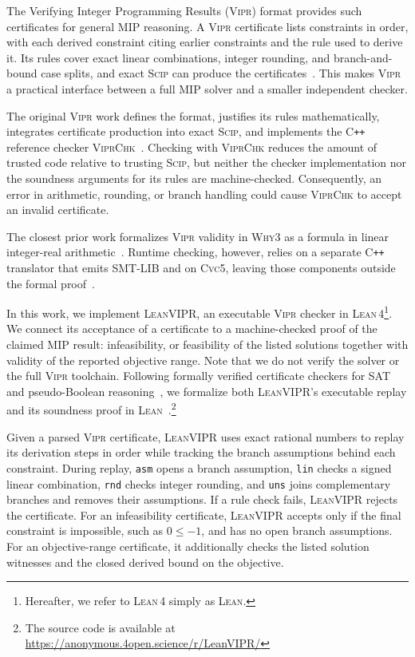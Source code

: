 \documentclass{article}
\newcommand{\code}[1]{\textcolor{blue!70!black}{\texttt{#1}}}
\newcommand{\tool}{\textsc{LeanVIPR}}
\newcommand{\scip}{\textsc{Scip}}
\newcommand{\vipr}{\textsc{Vipr}}
\newcommand{\lean}{\textsc{Lean}}
\begin{document}
The Verifying Integer Programming Results (\vipr{}) format provides such certificates for general MIP reasoning.
A \vipr{} certificate lists constraints in order, with each derived constraint citing earlier constraints and the rule used to derive it.
Its rules cover exact linear combinations, integer rounding, and branch-and-bound case splits, and exact \scip{} can produce the certificates~\citep{cheung2017verifying,eifler2023computational}.
This makes \vipr{} a practical interface between a full MIP solver and a smaller independent checker.

The original \vipr{} work defines the format, justifies its rules mathematically, integrates certificate production into exact \scip{}, and implements the C\texttt{++} reference checker \textsc{ViprChk}~\citep{cheung2017verifying}.
Checking with \textsc{ViprChk} reduces the amount of trusted code relative to trusting \scip{}, but neither the checker implementation nor the soundness arguments for its rules are machine-checked.
Consequently, an error in arithmetic, rounding, or branch handling could cause \textsc{ViprChk} to accept an invalid certificate.

The closest prior work formalizes \vipr{} validity in \textsc{Why3} as a formula in linear integer-real arithmetic~\citep{wood2025satisfiability,filliatre2013why3}.
Runtime checking, however, relies on a separate C\texttt{++} translator that emits SMT-LIB and on \textsc{Cvc5}, leaving those components outside the formal proof~\citep{barrett2010smt,barbosa2022cvc5}.

In this work, we implement \tool{}, an executable \vipr{} checker in
\textsc{Lean\,4}\footnote{Hereafter, we refer to \textsc{Lean\,4} simply as \textsc{Lean}.}.
We connect its acceptance of a certificate to a machine-checked proof of the claimed MIP result: infeasibility, or feasibility of the listed solutions together with validity of the reported objective range.
Note that we do not verify the solver or the full \vipr{} toolchain.
Following formally verified certificate checkers for SAT and pseudo-Boolean reasoning~\citep{szeider2026lrat,szeider2026pblean}, we formalize both \tool{}'s executable replay and its soundness proof in \lean{}~\citep{moura2021lean}.\footnote{The source code is available at \url{https://anonymous.4open.science/r/LeanVIPR/}}

Given a parsed \vipr{} certificate, \tool{} uses exact rational numbers to replay its derivation steps in order while tracking the branch assumptions behind each constraint.
During replay, \code{asm} opens a branch assumption, \code{lin} checks a signed linear combination, \code{rnd} checks integer rounding, and \code{uns} joins complementary branches and removes their assumptions.
If a rule check fails, \tool{} rejects the certificate.
For an infeasibility certificate, \tool{} accepts only if the final constraint is impossible, such as $0\le-1$, and has no open branch assumptions.
For an objective-range certificate, it additionally checks the listed solution witnesses and the closed derived bound on the objective.
\end{document}
